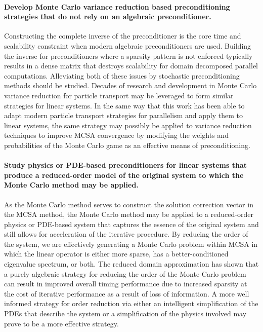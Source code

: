 \paragraph{\textbf{Develop Monte Carlo variance reduction based
  preconditioning strategies that do not rely on an algebraic
  preconditioner.}} Constructing the complete inverse of the
  preconditioner is the core time and scalability constraint when
  modern algebraic preconditioners are used. Building the inverse for
  preconditioners where a sparsity pattern is not enforced typically
  results in a dense matrix that destroys scalability for domain
  decomposed parallel computations. Alleviating both of these issues
  by stochastic preconditioning methods should be studied. Decades of
  research and development in Monte Carlo variance reduction for
  particle transport \cite{booth_1994} may be leveraged to form
  similar strategies for linear systems. In the same way that this
  work has been able to adapt modern particle transport strategies for
  parallelism and apply them to linear systems, the same strategy may
  possibly be applied to variance reduction techniques to improve MCSA
  convergence by modifying the weights and probabilities of the Monte
  Carlo game as an effective means of preconditioning.
\paragraph{\textbf{Study physics or PDE-based preconditioners for linear
  systems that produce a reduced-order model of the original system to
  which the Monte Carlo method may be applied.}} As the Monte Carlo
method serves to construct the solution correction vector in the MCSA
method, the Monte Carlo method may be applied to a reduced-order
physics or PDE-based system that captures the essence of the original
system and still allows for acceleration of the iterative
procedure. By reducing the order of the system, we are effectively
generating a Monte Carlo problem within MCSA in which the linear
operator is either more sparse, has a better-conditioned eigenvalue
spectrum, or both. The reduced domain approximation has shown that a
purely algebraic strategy for reducing the order of the Monte Carlo
problem can result in improved overall timing performance due to
increased sparsity at the cost of iterative performance as a result of
loss of information. A more well informed strategy for order reduction
via either an intelligent simplification of the PDEs that describe the
system or a simplification of the physics involved may prove to be a
more effective strategy.

